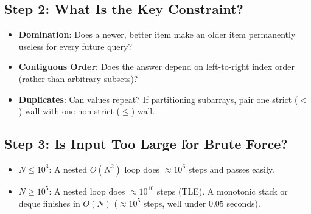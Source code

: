 \documentclass[11pt,a4paper]{article}
\theoremstyle{definition}
\begin{document}
\subsection*{Step 2: What Is the Key Constraint?}
\begin{itemize}
    \item \textbf{Domination}: Does a newer, better item make an older item permanently useless for every future query?
    \item \textbf{Contiguous Order}: Does the answer depend on left-to-right index order (rather than arbitrary subsets)?
    \item \textbf{Duplicates}: Can values repeat? If partitioning subarrays, pair one strict ($<$) wall with one non-strict ($\le$) wall.
\end{itemize}

\subsection*{Step 3: Is Input Too Large for Brute Force?}
\begin{itemize}
    \item \textbf{$N \le 10^3$}: A nested $O(N^2)$ loop does $\approx 10^6$ steps and passes easily.
    \item \textbf{$N \ge 10^5$}: A nested loop does $\approx 10^{10}$ steps (TLE). A monotonic stack or deque finishes in $O(N)$ ($\approx 10^5$ steps, well under $0.05$ seconds).
\end{itemize}
\end{document}
